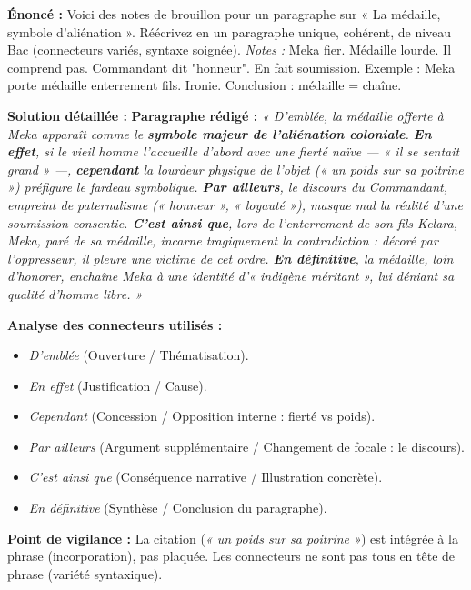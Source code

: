 \documentclass[11pt]{article}
\begin{document}
\begin{exoresolu}
\textbf{Énoncé :} Voici des notes de brouillon pour un paragraphe sur « La médaille, symbole d'aliénation ». Réécrivez en un paragraphe unique, cohérent, de niveau Bac (connecteurs variés, syntaxe soignée).
\textit{Notes :} Meka fier. Médaille lourde. Il comprend pas. Commandant dit "honneur". En fait soumission. Exemple : Meka porte médaille enterrement fils. Ironie. Conclusion : médaille = chaîne.

\tcblower
\textbf{Solution détaillée :}
\textbf{Paragraphe rédigé :}
\emph{« D'emblée, la médaille offerte à Meka apparaît comme le \textbf{symbole majeur de l'aliénation coloniale}. \textbf{En effet}, si le vieil homme l'accueille d'abord avec une fierté naïve — \emph{« il se sentait grand »} —, \textbf{cependant} la lourdeur physique de l'objet (\emph{« un poids sur sa poitrine »}) préfigure le fardeau symbolique. \textbf{Par ailleurs}, le discours du Commandant, empreint de paternalisme (\emph{« honneur », « loyauté »}), masque mal la réalité d'une soumission consentie. \textbf{C'est ainsi que}, lors de l'enterrement de son fils Kelara, Meka, paré de sa médaille, incarne tragiquement la contradiction : décoré par l'oppresseur, il pleure une victime de cet ordre. \textbf{En définitive}, la médaille, loin d'honorer, enchaîne Meka à une identité d'« indigène méritant », lui déniant sa qualité d'homme libre. »}

\textbf{Analyse des connecteurs utilisés :}
\begin{itemize}
    \item \emph{D'emblée} (Ouverture / Thématisation).
    \item \emph{En effet} (Justification / Cause).
    \item \emph{Cependant} (Concession / Opposition interne : fierté vs poids).
    \item \emph{Par ailleurs} (Argument supplémentaire / Changement de focale : le discours).
    \item \emph{C'est ainsi que} (Conséquence narrative / Illustration concrète).
    \item \emph{En définitive} (Synthèse / Conclusion du paragraphe).
\end{itemize}
\textbf{Point de vigilance :} La citation (\emph{« un poids sur sa poitrine »}) est intégrée à la phrase (incorporation), pas plaquée. Les connecteurs ne sont pas tous en tête de phrase (variété syntaxique).
\end{exoresolu}
\end{document}
